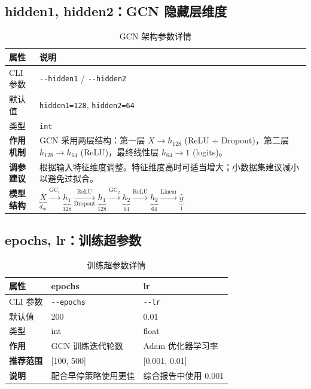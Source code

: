 \documentclass[11pt,a4paper]{ctexart}
\begin{document}
\subsection{hidden1, hidden2：GCN 隐藏层维度}

\begin{table}[H]\centering\caption{GCN 架构参数详情}\small
\begin{tabular}{lp{10cm}}
\toprule
属性 & 说明 \\
\midrule
CLI 参数 & \texttt{-{}-hidden1} / \texttt{-{}-hidden2} \\
默认值 & \texttt{hidden1=128}, \texttt{hidden2=64} \\
类型 & \texttt{int} \\
\midrule
\textbf{作用机制} & GCN 采用两层结构：第一层 $X \to h_{128}$ (ReLU + Dropout)，第二层 $h_{128} \to h_{64}$ (ReLU)，最终线性层 $h_{64} \to 1$ (logits)。\\
\textbf{调参建议} & 根据输入特征维度调整。特征维度高时可适当增大；小数据集建议减小以避免过拟合。\\
\textbf{模型结构} &
$\underbrace{X}_{d_{in}} \xrightarrow{\text{GC}_1} \underbrace{h_1}_{128} \xrightarrow[\text{Dropout}]{\text{ReLU}} \underbrace{h_1}_{128} \xrightarrow{\text{GC}_2} \underbrace{h_2}_{64} \xrightarrow{\text{ReLU}} \underbrace{h_2}_{64} \xrightarrow{\text{Linear}} \underbrace{\hat{y}}_{1}$ \\
\bottomrule
\end{tabular}\end{table}

\subsection{epochs, lr：训练超参数}

\begin{table}[H]\centering\caption{训练超参数详情}\small
\begin{tabular}{lp{5cm}p{5cm}}
\toprule
属性 & epochs & lr \\
\midrule
CLI 参数 & \texttt{-{}-epochs} & \texttt{-{}-lr} \\
默认值 & 200 & 0.01 \\
类型 & int & float \\
\midrule
\textbf{作用} & GCN 训练迭代轮数 & Adam 优化器学习率 \\
\textbf{推荐范围} & [100, 500] & [0.001, 0.01] \\
\textbf{说明} & 配合早停策略使用更佳 & 综合报告中使用 0.001 \\
\bottomrule
\end{tabular}\end{table}
\end{document}
